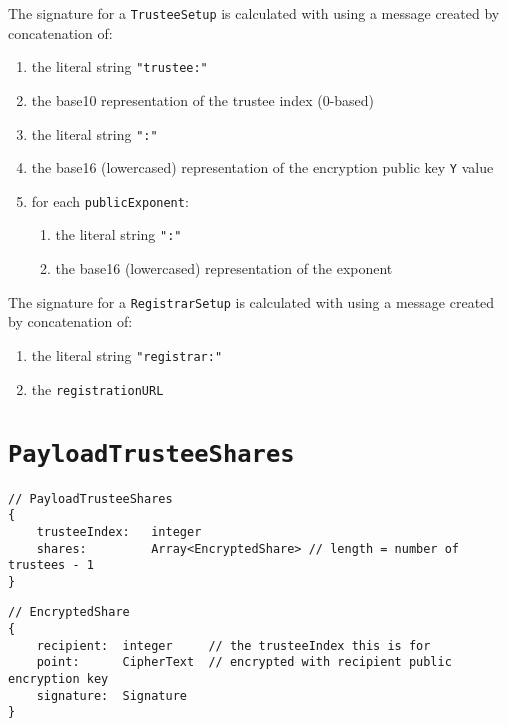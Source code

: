 The signature for a \texttt{TrusteeSetup} is calculated with using a message created by concatenation of:
\begin{enumerate}
    \item the literal string \lstinline[style=ES6]{"trustee:"}
    \item the base10 representation of the trustee index (0-based)
    \item the literal string \lstinline[style=ES6]{":"}
    \item the base16 (lowercased) representation of the encryption public key \texttt{Y} value
    \item for each \texttt{publicExponent}:
          \begin{enumerate}
              \item the literal string \lstinline[style=ES6]{":"}
              \item the base16 (lowercased) representation of the exponent
          \end{enumerate}
\end{enumerate}

The signature for a \texttt{RegistrarSetup} is calculated with using a message created by concatenation of:

\begin{enumerate}
    \item the literal string \lstinline[style=ES6]{"registrar:"}
    \item the \texttt{registrationURL}
\end{enumerate}

\newpage %
\section*{\texttt{PayloadTrusteeShares}}
\label{dt:payload:shares}
\begin{lstlisting}[style=ES6]
// PayloadTrusteeShares
{
    trusteeIndex:   integer
    shares:         Array<EncryptedShare> // length = number of trustees - 1
}
\end{lstlisting}
\vspace*{-0.95em}
\label{dt:encshare}
\begin{lstlisting}[style=ES6, firstnumber=last]
// EncryptedShare
{
    recipient:  integer     // the trusteeIndex this is for
    point:      CipherText  // encrypted with recipient public encryption key
    signature:  Signature
}
\end{lstlisting}

